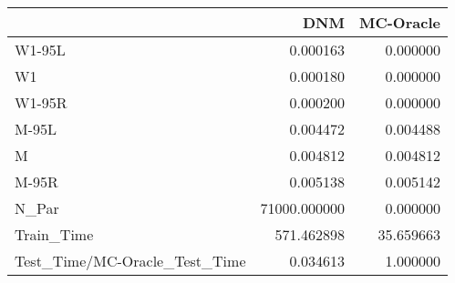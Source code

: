 \begin{tabular}{lrr}
\toprule
{} &           DNM &  MC-Oracle \\
\midrule
W1-95L                        &      0.000163 &   0.000000 \\
W1                            &      0.000180 &   0.000000 \\
W1-95R                        &      0.000200 &   0.000000 \\
M-95L                         &      0.004472 &   0.004488 \\
M                             &      0.004812 &   0.004812 \\
M-95R                         &      0.005138 &   0.005142 \\
N\_Par                         &  71000.000000 &   0.000000 \\
Train\_Time                    &    571.462898 &  35.659663 \\
Test\_Time/MC-Oracle\_Test\_Time &      0.034613 &   1.000000 \\
\bottomrule
\end{tabular}
